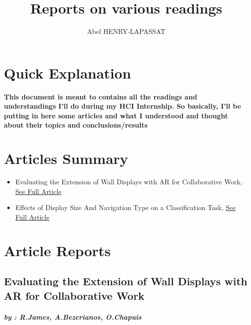 \documentclass{article}
\title{Reports on various readings}
\author{Abel HENRY-LAPASSAT}
\begin{document}
\maketitle
\section{Quick Explanation}
    \paragraph{ \textnormal{This document is meant to contains all the readings and understandings I'll do during my HCI Internship.
        So basically, I'll be putting in here some articles and what I understood and thought about their topics and conclusions/results} }

\section{Articles Summary}
    \begin{itemize}
        \item Evaluating the Extension of Wall Displays with AR for Collaborative Work, \href{https://hal.science/hal-04010673/document}{See Full Article}
        \item Effects of Display Size And Navigation Type on a Classification Task, \href{https://hal.science/file/index/docid/957269/filename/chi14-classify-hal-v1.pdf}{See Full Article}
    \end{itemize}

\section{Article Reports}
    \subsection{Evaluating the Extension of Wall Displays with AR for Collaborative Work}
    \subparagraph{by : R.James, A.Bezerianos, O.Chapuis}
    \cite{EEWDARCW:2023-03}
\end{document}
